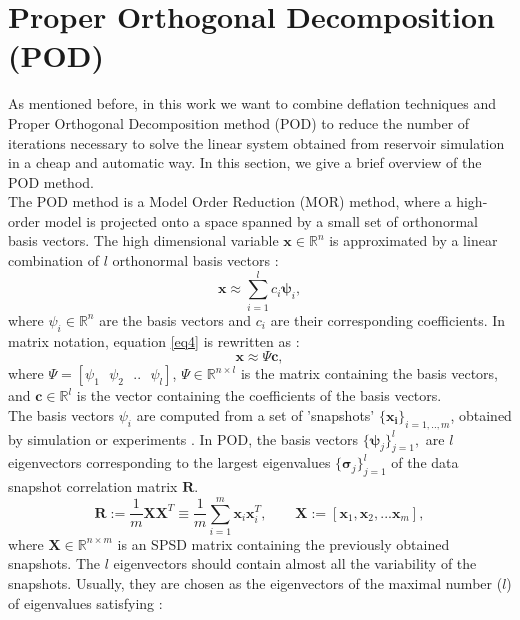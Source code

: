\documentclass[12pt]{article}
\numberwithin{equation}{section}
\begin{document}
\section{Proper Orthogonal Decomposition (POD)}\label{POD}

\hspace{0.5cm}
As mentioned before, in this work we want to combine deflation techniques and Proper Orthogonal Decomposition method (POD) to reduce the number of iterations necessary to solve the linear system obtained from reservoir simulation in a cheap and automatic way. In this section, we give a brief overview of the POD method.\\
The POD method is a Model Order Reduction (MOR) method, where a high-order model is projected onto a space
spanned by a small set of orthonormal basis vectors.
The high dimensional variable $\mathbf{x} \in \mathbb{R}^n$
is approximated by a linear combination of $l$ orthonormal basis vectors \cite{Astrid11}:
\begin{equation}\label{eq4}
  \mathbf{x}\approx \sum_{i=1}^lc_i \mathbf{\psi}_i,
\end{equation}
where $\psi_i \in \mathbb{R}^n$ are the basis vectors and $c_i$ are their corresponding coefficients.
In matrix notation, equation \eqref{eq4} is rewritten as :
$$\mathbf{x}\approx \Psi\mathbf{c},$$
where $\Psi=[\psi_1 \text{ }\psi_2 \text{ }.. \text{ }\psi_l]$, $\Psi \in \mathbb{R}^{n\times l}$ 
is the matrix containing the basis vectors, and $\mathbf{c} \in \mathbb{R}^l$ is the vector 
containing the coefficients of the basis vectors. \\
The basis vectors $\psi_i$ are computed from a set of 'snapshots' $\{ \mathbf{x_i}\} _{i=1,..,m}$, 
obtained by simulation or experiments \cite{Mark06}. 
In POD, the basis vectors $\{ \mathbf{\psi} _j \} ^l _{j=1},$ are $l$ eigenvectors corresponding to 
the largest eigenvalues $\{ \mathbf{\sigma} _j \} ^l _{j=1}$ of the data snapshot correlation matrix $\mathbf{R}$.
\begin{equation}\label{eq:POD}
\mathbf{R}:= \frac{1}{m}\mathbf{X}\mathbf{X}^T \equiv \frac{1}{m} \sum_{i=1}^m \mathbf{x}_i \mathbf{x}_i^T,
\qquad \mathbf{X}:=[\mathbf{x}_1,\mathbf{x}_2,...\mathbf{x}_m],
\end{equation}
where $\mathbf{X}\in \mathbb{R}^{n\times m}$ is an SPSD matrix containing the previously obtained snapshots.
The $l$ eigenvectors should contain almost all the variability of the snapshots. 
Usually, they are chosen as the eigenvectors of the maximal number ($l$) of eigenvalues satisfying \cite{Mark06}:
\end{document}
